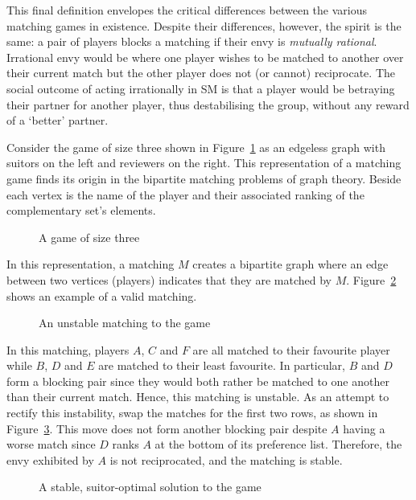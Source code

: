 This final definition envelopes the critical differences between the various
matching games in existence. Despite their differences, however, the spirit is
the same: a pair of players blocks a matching if their envy is \emph{mutually
rational}. Irrational envy would be where one player wishes to be matched to
another over their current match but the other player does not (or cannot)
reciprocate. The social outcome of acting irrationally in SM is that a player
would be betraying their partner for another player, thus destabilising the
group, without any reward of a `better' partner.

Consider the game of size three shown in Figure~\ref{fig:sm_matching} as an
edgeless graph with suitors on the left and reviewers on the right. This
representation of a matching game finds its origin in the bipartite matching
problems of graph theory. Beside each vertex is the name of the player and their
associated ranking of the complementary set’s elements.

\begin{figure}[htbp]
    \centering
    
    \caption{A game of size three}\label{fig:sm_matching}
\end{figure}

In this representation, a matching \(M\) creates a bipartite graph where an edge
between two vertices (players) indicates that they are matched by \(M\).
Figure~\ref{fig:sm_unstable} shows an example of a valid matching.

\begin{figure}[htbp]
    \centering
    
    \caption{An unstable matching to the game}\label{fig:sm_unstable}
\end{figure}

In this matching, players \(A\), \(C\) and \(F\) are all matched to their
favourite player while \(B\), \(D\) and \(E\) are matched to their least
favourite. In particular, \(B\) and \(D\) form a blocking pair since they would
both rather be matched to one another than their current match. Hence, this
matching is unstable. As an attempt to rectify this instability, swap the matches
for the first two rows, as shown in Figure~\ref{fig:sm_stable}. This move
does not form another blocking pair despite \(A\) having a worse match since
\(D\) ranks \(A\) at the bottom of its preference list. Therefore, the envy
exhibited by \(A\) is not reciprocated, and the matching is stable.

\begin{figure}[htbp]
    \centering
    
    \caption{A stable, suitor-optimal solution to the game}\label{fig:sm_stable}
\end{figure}

